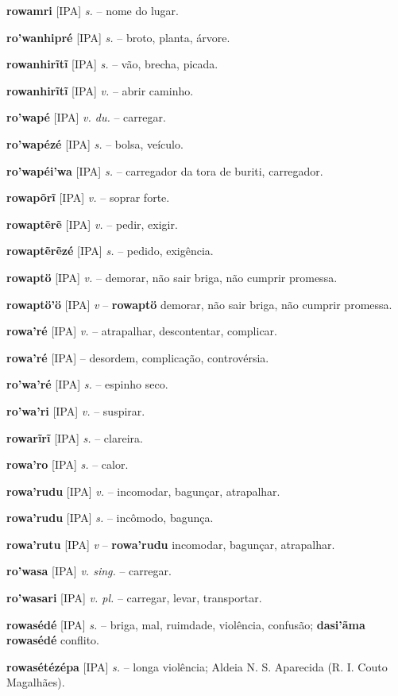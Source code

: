 \textbf{rowamri} [IPA] \textit{s.} -- nome do lugar.

\textbf{ro'wanhipré} [IPA] \textit{s.} -- broto, planta, árvore.

\textbf{rowanhirĩtĩ} [IPA] \textit{s.} -- vão, brecha, picada.

\textbf{rowanhirĩtĩ} [IPA] \textit{v.} -- abrir caminho.

\textbf{ro'wapé} [IPA] \textit{v. du.} -- carregar.

\textbf{ro'wapézé} [IPA] \textit{s.} -- bolsa, veículo.

\textbf{ro'wapéi'wa} [IPA] \textit{s.} -- carregador da tora de buriti, carregador.

\textbf{rowapõrĩ} [IPA] \textit{v.} -- soprar forte.

\textbf{rowaptẽrẽ} [IPA] \textit{v.} -- pedir, exigir.

\textbf{rowaptẽrẽzé} [IPA] \textit{s.} -- pedido, exigência.

\textbf{rowaptö} [IPA] \textit{v.} -- demorar, não sair briga, não cumprir promessa.

\textbf{rowaptö'ö} [IPA] \textit{v} -- \textbf{rowaptö} demorar, não sair briga, não cumprir promessa.

\textbf{rowa'ré} [IPA] \textit{v.} -- atrapalhar, descontentar, complicar.

\textbf{rowa'ré} [IPA] \textit{} -- desordem, complicação, controvérsia.

\textbf{ro'wa'ré} [IPA] \textit{s.} -- espinho seco.

\textbf{ro'wa'ri} [IPA] \textit{v.} -- suspirar.

\textbf{rowarĩrĩ} [IPA] \textit{s.} -- clareira.

\textbf{rowa'ro} [IPA] \textit{s.} -- calor.

\textbf{rowa'rudu} [IPA] \textit{v.} -- incomodar, bagunçar, atrapalhar.

\textbf{rowa'rudu} [IPA] \textit{s.} -- incômodo, bagunça.

\textbf{rowa'rutu} [IPA] \textit{v} -- \textbf{rowa'rudu} incomodar, bagunçar, atrapalhar.

\textbf{ro'wasa} [IPA] \textit{v. sing.} -- carregar.

\textbf{ro'wasari} [IPA] \textit{v. pl.} -- carregar, levar, transportar.

\textbf{rowasédé} [IPA] \textit{s.} -- briga, mal, ruimdade, violência, confusão; \textbf{dasi'ãma rowasédé} conflito.

\textbf{rowasétézépa} [IPA] \textit{s.} -- longa violência; Aldeia N. S. Aparecida (R. I. Couto Magalhães).

